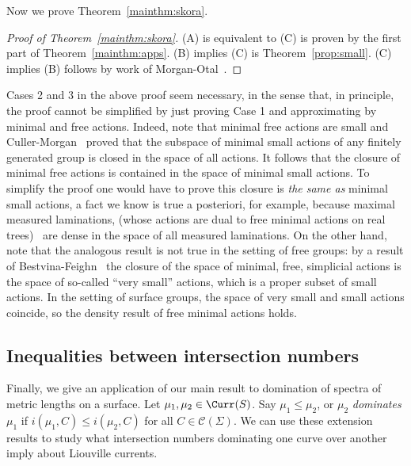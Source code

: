 Now we prove Theorem~\ref{mainthm:skora}.

\begin{proof}[Proof of Theorem~\ref{mainthm:skora}]
(A) is equivalent to (C) is proven by the first part of Theorem~\ref{mainthm:apps}.
(B) implies (C) is Theorem~\ref{prop:small}.
(C) implies (B) follows by work of Morgan-Otal~\cite{MO93:RelativeGrowths}.
\end{proof}

\begin{remark}

Cases 2 and 3 in the above proof seem necessary, in the sense that, in principle, the proof cannot be simplified by just proving Case 1 and approximating by minimal and free actions.
Indeed, note that minimal free actions are small and Culler-Morgan~\cite{CM87:GroupActions} proved that the subspace of minimal small actions of any finitely generated group is closed in the space of all actions.
It follows that the closure of minimal free actions is contained in the space of minimal small actions. To simplify the proof one would have to prove this closure is \emph{the same as} minimal small actions, a fact we know is true a posteriori, for example, because maximal measured laminations, (whose actions are dual to free minimal actions on real trees)~\cite{FLP79:ThurstonWorkSurfaces} are dense in the space of all measured laminations.
On the other hand, note that the analogous result is not true in the setting of free groups: by a result of Bestvina-Feighn~\cite{BF11:OuterLimits}
the closure of the space of minimal, free, simplicial actions is the space of so-called ``very small'' actions, which is a proper subset of small actions.
In the setting of surface groups, the space of very small and small actions coincide, so the density result of free minimal actions holds.
\end{remark}

\subsection{Inequalities between intersection numbers}
\label{subsec:ineqintersection}

Finally, we give an application of our main result to domination of spectra of metric lengths on a surface. Let $\mu_1,\mu_2 \in \Curr(S)$. Say $\mu_1 \leq \mu_2$, or $\mu_2$ \emph{dominates} $\mu_1$ if $i(\mu_1,C) \leq i(\mu_2,C)$ for all $C \in \mathcal{C}(\Sigma)$.
We can use these extension results to study what intersection numbers dominating one curve over another imply about Liouville currents.


